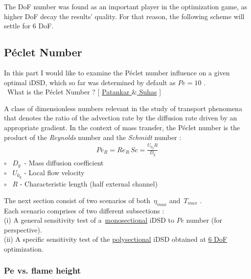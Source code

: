 \documentclass[12pt]{article}
\numberwithin{equation}{section}
\begin{document}
\begin{flushleft}
The DoF number was found as an important player in the optimization game, as higher DoF decay the results' quality. For that reason, the following scheme will settle for 6 DoF.
 
\subsection{Péclet Number}
In this part I would like to examine the Péclet number influence on a given optimal iDSD, which so far was determined by default as $Pe = 10$ . \\ \vspace{3mm}
\hspace{12mm} \ What is the Péclet Number ? [ \href{https://catatanstudi.files.wordpress.com/2010/02/numerical-heat-transfer-and-fluid-flow.pdf}{Patankar $\&$ Suhas} ]

A class of dimensionless numbers relevant in the study of transport phenomena that denotes the ratio of the advection rate by the diffusion rate driven by an appropriate gradient. In the context of mass transfer, the Péclet number is the product of the \textit{Reynolds} number and the \textit{Schmidt} number :
\begin{align*}
Pe_R = Re_R \, Sc = \frac{U_{0_g} R}{D_g}
\end{align*}
\hspace{15mm} $\circ$ \ $D_g$\, - Mass diffusion coefficient \\
\hspace{15mm} $\circ$ \ $U_{0_g}$ - Local flow velocity \\
\hspace{15mm} $\circ$ \ $R$ \hspace{1.6mm} - Characteristic length (half external channel)

The next section consist of two scenarios of both \,$\eta_{max}$ and \,$T_{max}$ . \\ Each scenario comprises of two different subsections : \\
(i) \hspace{0.2mm} A general sensitivity test of a\, \underline{monosectional} iDSD to $Pe$ number (for perspective). \\
(ii) A specific sensitivity test of the \underline{polysectional} iDSD obtained at \hyperref[T_d_6]{6 DoF} optimization.



\subsubsection{Pe vs. flame height}


\end{flushleft}
\end{document}
